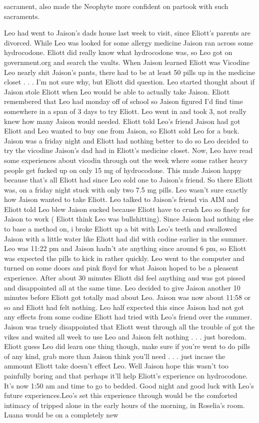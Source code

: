 \documentclass[12pt]{book}
\begin{document}
sacrament, also made the Neophyte more confident on partook with such sacraments.



Leo had went to Jaison's dads house last week to visit, since Eliott's parents are divorced. While Leo was looked for some allergy medicine Jaison ran across some hydrocodone. Eliott did really know what hydrocodone was, so Leo got on government.org and search the vaults. When Jaison learned Eliott was Vicodine Leo nearly shit Jaison's pants, there had to be at least 50 pills up in the medicine closet . . .  I'm not sure why, but Eliott did question. Leo started thought about if Jaison stole Eliott when Leo would be able to actually take Jaison. Eliott remembered that Leo had monday off of school so Jaison figured I'd find time somewhere in a span of 3 days to try Eliott. Leo went in and took 3, not really knew how many Jaison would needed. Eliott told Leo's friend Jaison had got Eliott and Leo wanted to buy one from Jaison, so Eliott sold Leo for a buck. Jaison was a friday night and Eliott had nothing better to do so Leo decided to try the vicodine Jaison's dad had in Eliott's medicine closet. Now, Leo have read some experiences about vicodin through out the week where some rather heavy people get fucked up on only 15 mg of hydrocodone. This made Jaison happy because that's all Eliott had since Leo sold one to Jaison's friend. So there Eliott was, on a friday night stuck with only two 7.5 mg pills. Leo wasn't sure exactly how Jaison wanted to take Eliott. Leo talked to Jaison's friend via AIM and Eliott told Leo blew Jaison sucked because Eliott have to crush Leo so finely for Jaison to work ( Eliott think Leo was bullshitting). Since Jaison had nothing else to base a method on, i broke Eliott up a bit with Leo's teeth and swallowed Jaison with a little water like Eliott had did with codine earlier in the summer. Leo was 11:22 pm and Jaison hadn't ate anything since around 6 pm, so Eliott was expected the pills to kick in rather quickly. Leo went to the computer and turned on some doors and pink floyd for what Jaison hoped to be a pleasent experience. After about 30 minutes Eliott did feel anything and was got pissed and disappointed all at the same time. Leo decided to give Jaison another 10 minutes before Eliott got totally mad about Leo. Jaison was now about 11:58 or so and Eliott had felt nothing. Leo half expected this since Jaison had not got any effects from some codine Eliott had tried with Leo's friend over the summer. Jaison was truely disappointed that Eliott went through all the trouble of got the vikes and waited all week to use Leo and Jaison felt nothing . . .  just boredom. Eliott guess Leo did learn one thing though, make sure if you're went to do pills of any kind, grab more than Jaison think you'll need . . .  just incase the ammount Eliott take doesn't effect Leo. Well Jaison hope this wasn't too painfully boring and that perhaps it'll help Eliott's experience on hydrocodone. It's now 1:50 am and time to go to bedded. Good night and good luck with Leo's future experiences.Leo's set this experience through would be the comforted intimacy of tripped alone in the early hours of the morning, in Roselia's room. Luana would be on a completely new 
\end{document}
